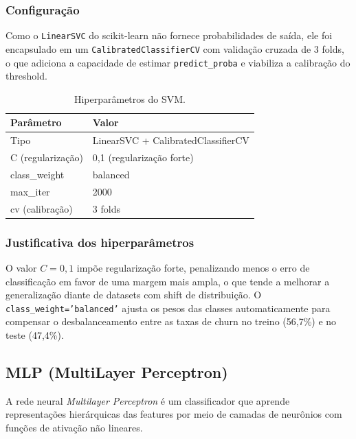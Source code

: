 \documentclass[12pt, a4paper]{article}
\begin{document}
\subsubsection{Configuração}

Como o \texttt{LinearSVC} do scikit-learn não fornece probabilidades de saída,
ele foi encapsulado em um \texttt{CalibratedClassifierCV} com validação cruzada de
3 folds, o que adiciona a capacidade de estimar \texttt{predict\_proba} e viabiliza
a calibração do threshold.

\begin{table}[H]
  \centering
  \caption{Hiperparâmetros do SVM.}
  \begin{tabular}{ll}
    \toprule
    Parâmetro & Valor \\
    \midrule
    Tipo            & LinearSVC + CalibratedClassifierCV \\
    C (regularização) & 0,1 (regularização forte) \\
    class\_weight   & balanced \\
    max\_iter       & 2000 \\
    cv (calibração) & 3 folds \\
    \bottomrule
  \end{tabular}
  \label{tab:svm_params}
\end{table}

\subsubsection{Justificativa dos hiperparâmetros}

O valor $C = 0{,}1$ impõe regularização forte, penalizando menos o erro de
classificação em favor de uma margem mais ampla, o que tende a melhorar a
generalização diante de datasets com shift de distribuição. O \texttt{class\_weight='balanced'}
ajusta os pesos das classes automaticamente para compensar o desbalanceamento entre
as taxas de churn no treino (56,7\%) e no teste (47,4\%).

\subsection{MLP (MultiLayer Perceptron)}

A rede neural \textit{Multilayer Perceptron} é um classificador que aprende
representações hierárquicas das features por meio de camadas de neurônios com
funções de ativação não lineares.
\end{document}
